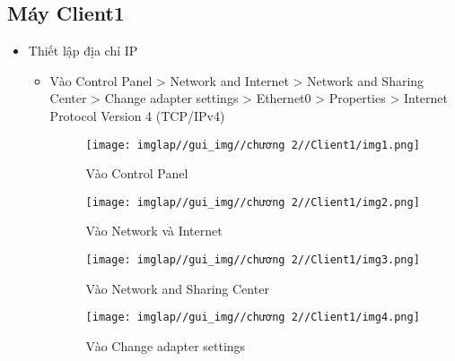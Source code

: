 \documentclass[13pt]{article}
\begin{document}
            \subsection{Máy Client1}
                 \begin{itemize}
                    \item Thiết lập địa chỉ IP
                        \begin{itemize}
                        \item Vào Control Panel > Network and Internet > Network and Sharing Center > Change adapter settings > Ethernet0 > Properties > Internet Protocol Version 4 (TCP/IPv4)
                        \begin{figure}[H]
                            \centering
                            \texttt{[image: imglap//gui\_img//chương 2//Client1/img1.png]}
                            \caption{Vào Control Panel}
                            \label{fig:enter-label}
                        \end{figure}

                        \begin{figure}[H]
                            \centering
                            \texttt{[image: imglap//gui\_img//chương 2//Client1/img2.png]}
                            \caption{Vào Network và Internet}
                            \label{fig:enter-label}
                        \end{figure}

                        \begin{figure}[H]
                            \centering
                            \texttt{[image: imglap//gui\_img//chương 2//Client1/img3.png]}
                            \caption{Vào Network and Sharing Center}
                            \label{fig:enter-label}
                        \end{figure}

                        \begin{figure}[H]
                            \centering
                            \texttt{[image: imglap//gui\_img//chương 2//Client1/img4.png]}
                            \caption{Vào Change adapter settings}
                            \label{fig:enter-label}
                        \end{figure}


\end{itemize}
\end{itemize}
\end{document}
